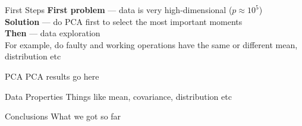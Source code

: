 \documentclass[9pt]{beamer}
\begin{document}
\begin{frame}{First Steps}
\textbf{First problem} --- data is very high-dimensional ($p\approx 10^5$)\\
\textbf{Solution} --- do PCA first to select the most important moments\\[.4cm]
\textbf{Then} --- data exploration\\
For example, do faulty and working operations have the same or different mean, distribution etc
\end{frame}
\begin{frame}{PCA}
PCA results go here
\end{frame}
\begin{frame}{Data Properties}
Things like mean, covariance, distribution etc
\end{frame}
\begin{frame}{Conclusions}
What we got so far
\end{frame}
\end{document}
